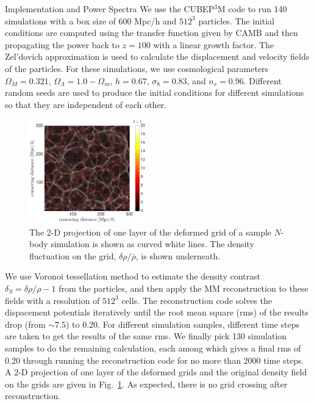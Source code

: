 \begin{section}{Implementation and Power Spectra}
  \label{sec:simulation}
  We use the \textsc{CUBEP$^3$M} code \cite{bib:Harnois2013} to run
  140 simulations with a box size of 600 Mpc/h and $512^3$ particles.
  The initial conditions are computed using the transfer function
  given by CAMB \cite{bib:Lewis2000} and then propagating the power
  back to $z=100$ with a linear growth factor.  The Zel'dovich
  approximation is used to calculate the displacement and velocity
  fields of the particles.  For these simulations, we use cosmological
  parameters $\Omega_M=0.321$, $\Omega_{\Lambda}=1.0-\Omega_m$,
  $h=0.67$, $\sigma_8=0.83$, and $n_s=0.96$.  Different random seeds
  are used to produce the initial conditions for different simulations
  so that they are independent of each other.

  \begin{figure}[h]
    \centering
    \includegraphics[width=0.45\textwidth]{fig1.pdf}
    \caption{ The 2-D projection of one layer of the deformed grid of a sample
      $N$-body simulation is shown as curved white lines.  The
      density fluctuation on the grid, $\delta\rho/\bar{\rho}$, is shown
      underneath.}
    \label{fig:simandrec}
 \end{figure}

  We use Voronoi tessellation method to estimate the density
  contrast $\delta_S=\delta\rho/\rho-1$ from the particles, and then
  apply the MM reconstruction to these fields with a resolution of
  $512^3$ cells.  The reconstruction code solves the dispacement potentials 
  iteratively until the root mean square (rms) of the results drop (from $\sim 7.5$) 
  to 0.20. For different simulation samples, different time steps are taken to get 
  the results of the same rms. We finally pick 130 simulation samples to do the remaining calculation, 
  each among which gives a final rms of 0.20
  through running the reconstruction code for no more than 2000 time steps. 
  A 2-D projection of one layer of the deformed grids and the
  original density field on the grids are given in Fig.~\ref{fig:simandrec}.  As
  expected, there is no grid crossing after reconstruction.
 

\end{section}
